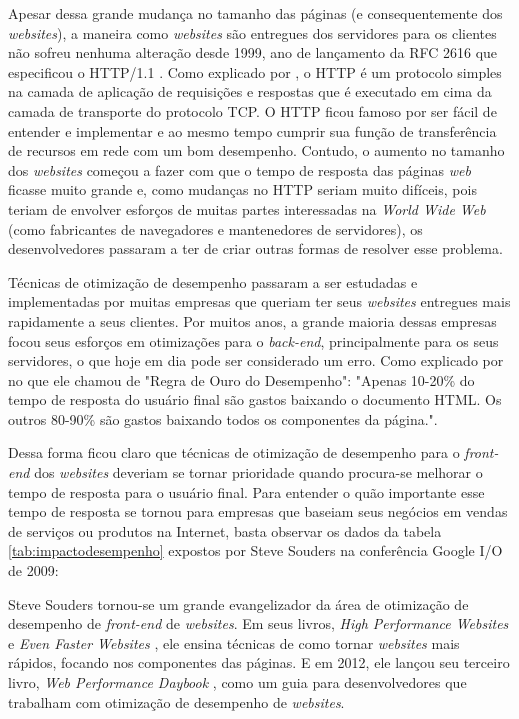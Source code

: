 Apesar dessa grande mudança no tamanho das páginas (e consequentemente dos \textit{websites}), a maneira como \textit{websites} são entregues dos servidores para os clientes não sofreu nenhuma alteração desde 1999, ano de lançamento da RFC 2616 que especificou o HTTP/1.1 \cite{RFC2616}. Como explicado por \cite{Tanenbaum}, o HTTP é um protocolo simples na camada de aplicação de requisições e respostas que é executado em cima da camada de transporte do protocolo TCP. O HTTP ficou famoso por ser fácil de entender e implementar e ao mesmo tempo cumprir sua função de transferência de recursos em rede com um bom desempenho. Contudo, o aumento no tamanho dos \textit{websites} começou a fazer com que o tempo de resposta das páginas \textit{web} ficasse muito grande e, como mudanças no HTTP seriam muito difíceis, pois teriam de envolver esforços de muitas partes interessadas na \textit{World Wide Web} (como fabricantes de navegadores e mantenedores de servidores), os desenvolvedores passaram a ter de criar outras formas de resolver esse problema.

Técnicas de otimização de desempenho passaram a ser estudadas e implementadas por muitas empresas que queriam ter seus \textit{websites} entregues mais rapidamente a seus clientes. Por muitos anos, a grande maioria dessas empresas focou seus esforços em otimizações para o \textit{back-end}, principalmente para os seus servidores, o que hoje em dia pode ser considerado um erro. Como explicado por  no que ele chamou de "Regra de Ouro do Desempenho": "Apenas 10-20\% do tempo de resposta do usuário final são gastos baixando o documento HTML. Os outros 80-90\% são gastos baixando todos os componentes da página.".

Dessa forma ficou claro que técnicas de otimização de desempenho para o \textit{front-end} dos \textit{websites} deveriam se tornar prioridade quando procura-se melhorar o tempo de resposta para o usuário final. Para entender o quão importante esse tempo de resposta se tornou para empresas que baseiam seus negócios em vendas de serviços ou produtos na Internet, basta observar os dados da tabela \autoref{tab:impactodesempenho} expostos por Steve Souders na conferência Google I/O de 2009:



Steve Souders tornou-se um grande evangelizador da área de otimização de desempenho de \textit{front-end} de \textit{websites}. Em seus livros, \textit{High Performance Websites} \cite{HighPerformance} e \textit{Even Faster Websites} \cite{EvenFaster}, ele ensina técnicas de como tornar \textit{websites} mais rápidos, focando nos componentes das páginas. E em 2012, ele lançou seu terceiro livro, \textit{Web Performance Daybook} \cite{WebPerformance}, como um guia para desenvolvedores que trabalham com otimização de desempenho de \textit{websites}.


